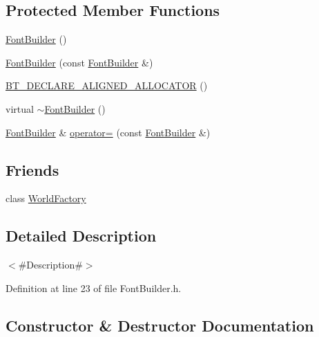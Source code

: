 \subsection*{Protected Member Functions}
\begin{DoxyCompactItemize}
\item 
\mbox{\hyperlink{classnjli_1_1_font_builder_af1bf89e07e97044c41ef63782919e048}{Font\+Builder}} ()
\item 
\mbox{\hyperlink{classnjli_1_1_font_builder_a552bc27c16d565f7c6f4cb9a02deec3a}{Font\+Builder}} (const \mbox{\hyperlink{classnjli_1_1_font_builder}{Font\+Builder}} \&)
\item 
\mbox{\hyperlink{classnjli_1_1_font_builder_a2b10c49afaf95709729b0be017291733}{B\+T\+\_\+\+D\+E\+C\+L\+A\+R\+E\+\_\+\+A\+L\+I\+G\+N\+E\+D\+\_\+\+A\+L\+L\+O\+C\+A\+T\+OR}} ()
\item 
virtual \mbox{\hyperlink{classnjli_1_1_font_builder_a65677ae3fe227dd6216e85313ce94ad0}{$\sim$\+Font\+Builder}} ()
\item 
\mbox{\hyperlink{classnjli_1_1_font_builder}{Font\+Builder}} \& \mbox{\hyperlink{classnjli_1_1_font_builder_a4115c1b65ceb0c0f1cc38b94f923ede8}{operator=}} (const \mbox{\hyperlink{classnjli_1_1_font_builder}{Font\+Builder}} \&)
\end{DoxyCompactItemize}
\subsection*{Friends}
\begin{DoxyCompactItemize}
\item 
class \mbox{\hyperlink{classnjli_1_1_font_builder_acb96ebb09abe8f2a37a915a842babfac}{World\+Factory}}
\end{DoxyCompactItemize}


\subsection{Detailed Description}
$<$\#\+Description\#$>$ 

Definition at line 23 of file Font\+Builder.\+h.



\subsection{Constructor \& Destructor Documentation}
\mbox{\label{classnjli_1_1_font_builder_af1bf89e07e97044c41ef63782919e048}} 
